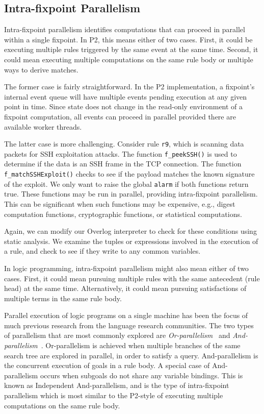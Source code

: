 \documentclass[10pt,twocolumn]{MyTightStyle}
\newcommand{\ol}[1]{{\tt\footnotesize#1}}
\begin{document}
\subsection{Intra-fixpoint Parallelism}

Intra-fixpoint parallelism identifies computations that can proceed in parallel within a single fixpoint. In P2, this means either of two cases. First, it could be executing multiple rules triggered by the same event at the same time. Second, it could mean executing multiple computations on the same rule body or multiple ways to derive matches.

The former case is fairly straightforward. In the P2 implementation, a fixpoint's internal event queue will have multiple events pending execution at any given point in time. Since state does not change in the read-only environment of a fixpoint computation, all events can proceed in parallel provided there are available worker threads.

The latter case is more challenging. Consider rule \ol{r9}, which is
scanning data packets for SSH exploitation attacks. The function \ol{f\_peekSSH()} is used to determine if the data is an SSH frame in the
TCP connection. The function \ol{f\_matchSSHExploit()} checks to see if
the payload matches the known signature of the exploit. We only want to
raise the global \ol{alarm} if both functions return true. These
functions may be run in parallel, providing intra-fixpoint
parallelism. This can be significant when such functions may be
expensive, e.g., digest computation functions, cryptographic functions,
or statistical computations.

Again, we can modify our Overlog interpreter to check for these conditions using static analysis. We examine the tuples or expressions involved in the execution of a rule, and check to see if they write to any common variables.

In logic programming, intra-fixpoint parallelism might also mean either of two cases. First, it could mean pursuing multiple rules with the same antecedent (rule head) at the same time. Alternatively, it could mean pursuing satisfactions of multiple terms in the same rule body.

Parallel execution of logic programs on a single machine has been the focus of much previous research from the language research communities. The two types of parallelism that are most commonly explored are {\em Or-parallelism}~\cite{gupta01} and {\em And-parallelism}~\cite{gupta01}. Or-parallelism is achieved when multiple branches of the same search tree are explored in parallel, in order to satisfy a query. And-parallelism is the concurrent execution of goals in a rule body. A special case of And-parallelism occurs when subgoals do not share any variable bindings. This is known as Independent And-parallelism, and is the type of intra-fixpoint parallelism which is most similar to the P2-style of executing multiple computations on the same rule body.
\end{document}
